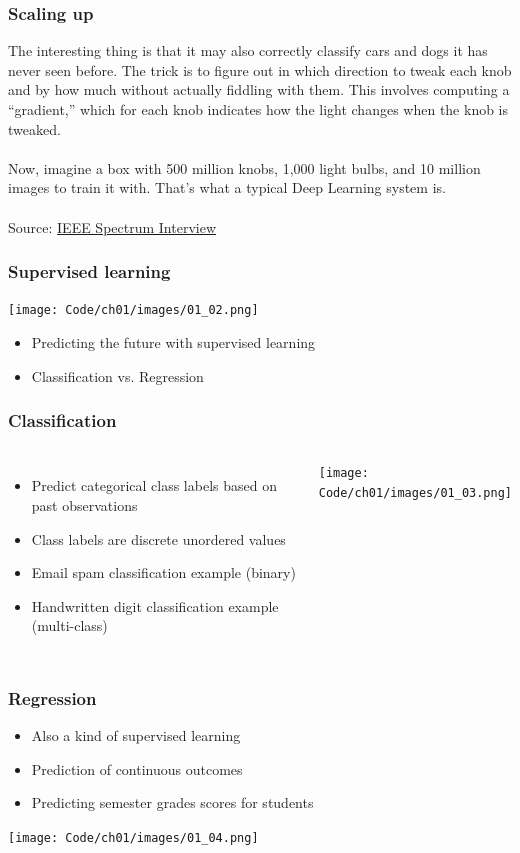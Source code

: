 \documentclass{beamer}
\begin{document}
\begin{frame}
  \frametitle{Scaling up}
  The interesting thing is that it may also correctly classify cars and dogs it has never seen before. The trick is to figure out in which direction to tweak each knob and by how much without actually fiddling with them. This involves computing a “gradient,” which for each knob indicates how the light changes when the knob is tweaked.
  \\~\\
  Now, imagine a box with 500 million knobs, 1,000 light bulbs, and 10 million images to train it with. That’s what a typical Deep Learning system is.
  \\~\\
  Source: \href{http://spectrum.ieee.org/automaton/robotics/artificial-intelligence/facebook-ai-director-yann-lecun-on-deep-learning}{IEEE Spectrum Interview}
\end{frame}

\begin{frame}
  \frametitle{Supervised learning}
  \texttt{[image: Code/ch01/images/01\_02.png]}
  \begin{itemize}
  \item Predicting the future with supervised learning
  \item Classification vs. Regression
  \end{itemize}
\end{frame}

\begin{frame}
  \frametitle{Classification}
  \begin{columns}[c]
    \begin{itemize}
    \item Predict categorical class labels based on past observations
    \item Class labels are discrete unordered values
    \item Email spam classification example (binary)
    \item Handwritten digit classification example (multi-class)
    \end{itemize}
    \texttt{[image: Code/ch01/images/01\_03.png]}
  \end{columns}
\end{frame}

\begin{frame}
  \frametitle{Regression}
  \begin{itemize}
  \item Also a kind of supervised learning
  \item Prediction of continuous outcomes
  \item Predicting semester grades scores for students
  \end{itemize}
  \center
  \texttt{[image: Code/ch01/images/01\_04.png]}
\end{frame}
\end{document}
